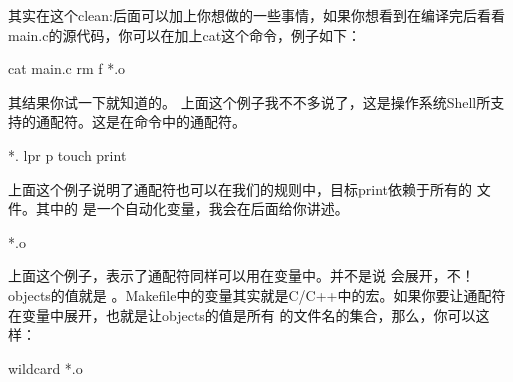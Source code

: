 \documentclass[a4paper,10pt]{sphinxmanual}
\begin{document}
其实在这个clean:后面可以加上你想做的一些事情，如果你想看到在编译完后看看main.c的源代码，你可以在加上cat这个命令，例子如下：

\begin{sphinxVerbatim}[commandchars=\\\{\}]
    cat main.c
    rm \PYGZhy{}f *.o
\end{sphinxVerbatim}

其结果你试一下就知道的。 上面这个例子我不不多说了，这是操作系统Shell所支持的通配符。这是在命令中的通配符。

\begin{sphinxVerbatim}[commandchars=\\\{\}]
 *.
    lpr \PYGZhy{}p 
    touch print
\end{sphinxVerbatim}

上面这个例子说明了通配符也可以在我们的规则中，目标print依赖于所有的  文件。其中的
 是一个自动化变量，我会在后面给你讲述。

\begin{sphinxVerbatim}[commandchars=\\\{\}]
  *.o
\end{sphinxVerbatim}

上面这个例子，表示了通配符同样可以用在变量中。并不是说  会展开，不！objects的值就是
 。Makefile中的变量其实就是C/C++中的宏。如果你要让通配符在变量中展开，也就是让objects的值是所有  的文件名的集合，那么，你可以这样：

\begin{sphinxVerbatim}[commandchars=\\\{\}]
  wildcard *.o
\end{sphinxVerbatim}
\end{document}
